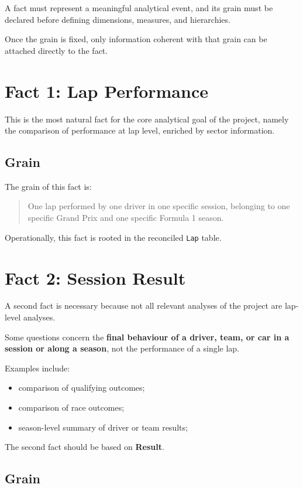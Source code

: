 \documentclass[a4paper,11pt]{article}
\begin{document}
	A fact must represent a meaningful analytical event, and its grain must be declared before defining dimensions, measures, and hierarchies.
	
	Once the grain is fixed, only information coherent with that grain can be attached directly to the fact.
	
	
	\section{Fact 1: Lap Performance}
	
	This is the most natural fact for the core analytical goal of the project, namely the comparison of performance at lap level, enriched by sector information.
	
	\subsection{Grain}
	
	The grain of this fact is:
	\begin{quote}
		One lap performed by one driver in one specific session, belonging to one specific Grand Prix and one specific Formula 1 season.
	\end{quote}
	
	Operationally, this fact is rooted in the reconciled \texttt{Lap} table.
	
	
	\section{Fact 2: Session Result}
	
	A second fact is necessary because not all relevant analyses of the project are lap-level analyses.
	
	Some questions concern the \textbf{final behaviour of a driver, team, or car in a session or along a season}, not the performance of a single lap.
	
	Examples include:
	\begin{itemize}[leftmargin=1.5em]
		\item comparison of qualifying outcomes;
		\item comparison of race outcomes;
		\item season-level summary of driver or team results;
	\end{itemize}
	

	
	The second fact should be based on \textbf{Result}.
	
	\subsection{Grain}
	
\end{document}
